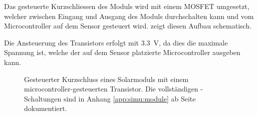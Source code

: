 Das  gesteuerte Kurzschliessen  des Moduls  wird mit  einem MOSFET  umgesetzt,
welcher zwischen  Eingang und  Ausgang des Moduls  durchschalten kann  und vom
Microcontroller auf dem Sensor gesteuert wird. 
zeigt diesen Aufbau schematisch.

Die  Ansteuerung des  Transistors  erfolgt mit  \SI{3.3}{\volt},  da dies  die
maximale Spannung  ist, welche der  auf dem Sensor  platzierte Microcontroller
ausgeben kann.

\begin{figure}[h!tb]
    \centering
    
    \caption{%
        Gesteuerter     Kurzschluss     eines    Solarmoduls     mit     einem
        microcontroller-gesteuerten       Transistor. Die      vollst\"andigen
        -Schaltungen  sind  in Anhang  \ref{app:simu:module}  ab
        Seite \pageref{app:simu:module} dokumentiert.%
    }
    \label{fig:module:mosfet:simple}
\end{figure}


